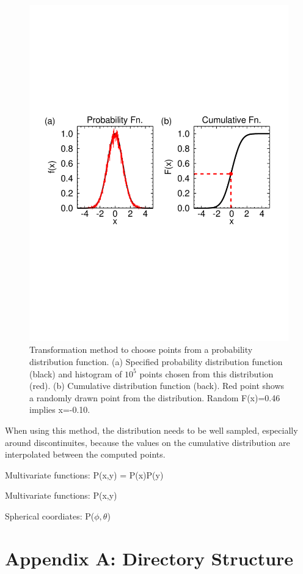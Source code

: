 \documentclass[11pt]{article}
\begin{document}
\begin{figure}
\includegraphics[width=6in]{probdist.pdf}
\caption{Transformation method to choose points from a probability distribution
function. (a) Specified probability distribution function (black) and histogram
of $10^5$ points chosen from this distribution (red). (b) Cumulative
distribution function (back). Red point shows a randomly drawn point from the
distribution. Random F(x)=0.46 implies x=-0.10.}
\label{fig:probdist}
\end{figure}

When using this method, the distribution needs to be well sampled, especially
around discontinuites, because the values on the cumulative distribution are
interpolated between the computed points.

Multivariate functions: P(x,y) = P(x)P(y)

Multivariate functions: P(x,y)

Spherical coordiates: P($\phi,\theta$)

\section{Appendix A: Directory Structure}
\end{document}
